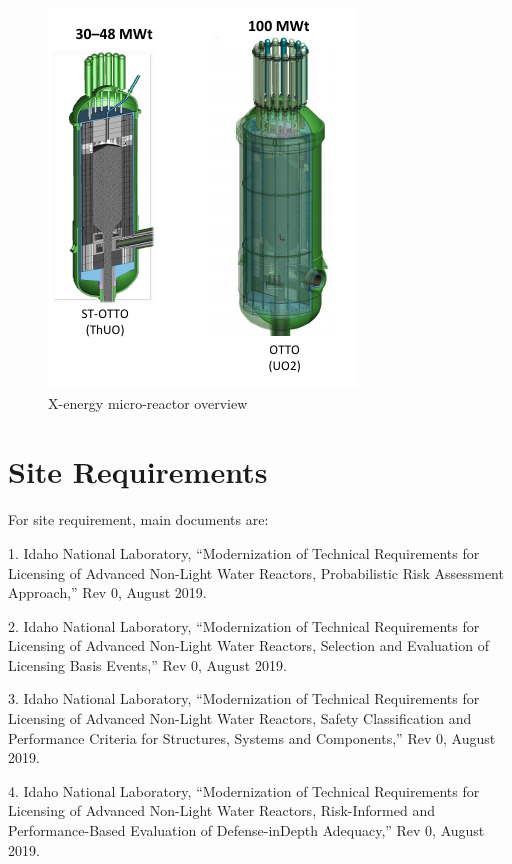 \documentclass[10pt,a4paper]{article}
\begin{document}
\begin{figure}[hbtp]
\centering
\includegraphics[scale=0.97]{Figs/xoverview.jpeg}
\caption{X-energy micro-reactor overview}
\label{xo}
\end{figure} 

\pagebreak
\section{Site Requirements}
For site requirement, main documents are: 

1. Idaho National Laboratory, “Modernization of Technical Requirements for Licensing of Advanced Non-Light Water Reactors, Probabilistic Risk Assessment Approach,” Rev 0, August 2019.

2. Idaho National Laboratory, “Modernization of Technical Requirements for Licensing of Advanced Non-Light Water Reactors, Selection and Evaluation of Licensing Basis Events,” Rev 0, August 2019.

3. Idaho National Laboratory, “Modernization of Technical Requirements for Licensing of Advanced Non-Light Water Reactors, Safety Classification and Performance Criteria for Structures, Systems and Components,” Rev 0, August 2019.

4. Idaho National Laboratory, “Modernization of Technical Requirements for Licensing of Advanced Non-Light Water Reactors, Risk-Informed and Performance-Based Evaluation of Defense-inDepth Adequacy,” Rev 0, August 2019.

\pagebreak
\end{document}
